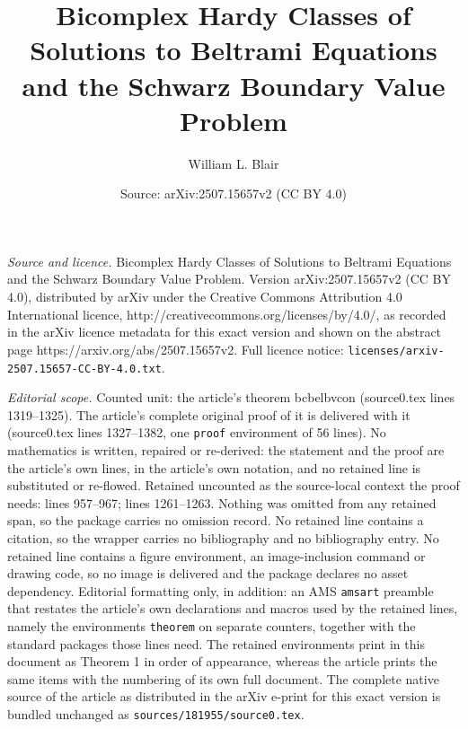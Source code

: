 \documentclass[10pt,a4paper]{amsart}
\title{Bicomplex Hardy Classes of Solutions to Beltrami Equations and the Schwarz Boundary Value Problem}
\author{William L. Blair}
\date{Source: arXiv:2507.15657v2 (CC BY 4.0)}
\begin{document}
\maketitle

\noindent\emph{Source and licence.} Bicomplex Hardy Classes of Solutions to Beltrami Equations and the Schwarz Boundary Value Problem. Version arXiv:2507.15657v2 (CC BY 4.0), distributed by arXiv under the Creative Commons Attribution 4.0 International licence, http://creativecommons.org/licenses/by/4.0/, as recorded in the arXiv licence metadata for this exact version and shown on the abstract page https://arxiv.org/abs/2507.15657v2. Full licence notice: \texttt{licenses/arxiv-2507.15657-CC-BY-4.0.txt}.\par\smallskip

\noindent\textit{Editorial scope.} Counted unit: the article's theorem bcbelbvcon (source0.tex lines 1319--1325). The article's complete original proof of it is delivered with it (source0.tex lines 1327--1382, one \texttt{proof} environment of 56 lines). No mathematics is written, repaired or re-derived: the statement and the proof are the article's own lines, in the article's own notation, and no retained line is substituted or re-flowed.  Retained uncounted as the source-local context the proof needs: lines 957--967; lines 1261--1263.  Nothing was omitted from any retained span, so the package carries no omission record.  No retained line contains a citation, so the wrapper carries no bibliography and no bibliography entry.  No retained line contains a figure environment, an image-inclusion command or drawing code, so no image is delivered and the package declares no asset dependency.  Editorial formatting only, in addition: an AMS \texttt{amsart} preamble that restates the article's own declarations and macros used by the retained lines, namely the environments \texttt{theorem} on separate counters, together with the standard packages those lines need.  The retained environments print in this document as Theorem 1 in order of appearance, whereas the article prints the same items with the numbering of its own full document.  The complete native source of the article as distributed in the arXiv e-print for this exact version is bundled unchanged as \texttt{sources/181955/source0.tex}.
\end{document}
